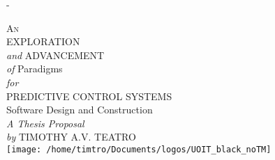 \begin{titlingpage}
	\calccentering{\unitlength}
	\begin{adjustwidth*}{\unitlength}{-\unitlength}
		\null
		\vfill
		\begin{center}
			\Large
			{%
      \textsc{An}\\
      EXPLORATION\\ \textit{and} ADVANCEMENT\\
      \textit{of} Paradigms\\
      \textit{for}\\
      PREDICTIVE CONTROL SYSTEMS\\
      Software Design and Construction
      }\\[6ex]
			{\large\itshape A Thesis Proposal}\\[4ex]
			{\normalsize\textit{by} \uppercase{ Timothy A.V. Teatro}}\\[1ex]
			\vfill
			\texttt{[image: /home/timtro/Documents/logos/UOIT\_black\_noTM]}
		\end{center}
		\vfill
	\end{adjustwidth*}
\end{titlingpage}
